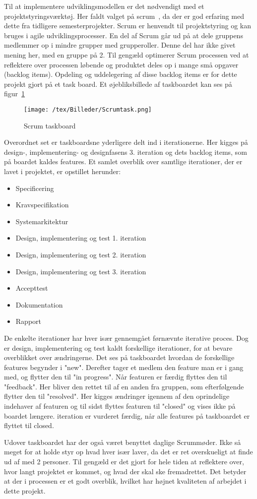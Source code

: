 Til at implementere udviklingsmodellen er det nødvendigt med et projektstyringsværktøj. Her faldt valget på scrum~\cite{Scrum}, da der er god erfaring med dette fra tidligere semesterprojekter. Scrum er henvendt til projektstyring og kan bruges i agile udviklingsprocesser. En del af Scrum går ud på at dele gruppens medlemmer op i mindre grupper med grupperoller. Denne del har ikke givet mening her, med en gruppe på 2. 
Til gengæld optimerer Scrum processen ved at reflektere over processen løbende og produktet deles op i mange små opgaver (backlog items). Opdeling og uddelegering af disse backlog items er for dette projekt gjort på et task board. Et øjebliksbillede af taskboardet kan ses på figur~\ref{fig:Taskboard} 
\begin{figure}[H]
	\center
	\texttt{[image: /tex/Billeder/Scrumtask.png]}
	\caption{Scrum taskboard}
	\label{fig:Taskboard}
\end{figure} 
Overordnet set er taskboardsne yderligere delt ind i iterationerne. Her kigges på design-, implementering- og designfasens 3. iteration og dets backlog items, som på boardet kaldes features. Et samlet overblik over samtlige iterationer, der er lavet i projektet, er opstillet herunder:

\begin{itemize}
\item Specificering
\item Kravspecifikation
\item Systemarkitektur
\item Design, implementering og test 1. iteration
\item Design, implementering og test 2. iteration
\item Design, implementering og test 3. iteration
\item Accepttest
\item Dokumentation
\item Rapport
\end{itemize}

De enkelte iterationer har hver især gennemgået førnævnte iterative proces. Dog er design, implementering og test kaldt forskellige iterationer, for at bevare overblikket over ændringerne. Det ses på taskboardet hvordan de forskellige features begynder i "new". Derefter tager et medlem den feature man er i gang med, og flytter den til "in progress". Når featuren er færdig flyttes den til "feedback". Her bliver den rettet til af en anden fra gruppen, som efterfølgende flytter den til "resolved". Her kigges ændringer igennem af den oprindelige indehaver af featuren og til sidst flyttes featuren til "closed" og vises ikke på boardet længere. 
iteration er vurderet færdig, når alle features på taskboardet er flyttet til closed.

Udover taskboardet har der også været benyttet daglige Scrummøder. Ikke så meget for at holde styr op hvad hver især laver, da det er ret overskueligt at finde ud af med 2 personer. Til gengæld er det gjort for hele tiden at reflektere over, hvor langt projektet er kommet, og hvad der skal ske fremadrettet. Det betyder at der i processen er et godt overblik, hvilket har højnet kvaliteten af arbejdet i dette projekt.

 